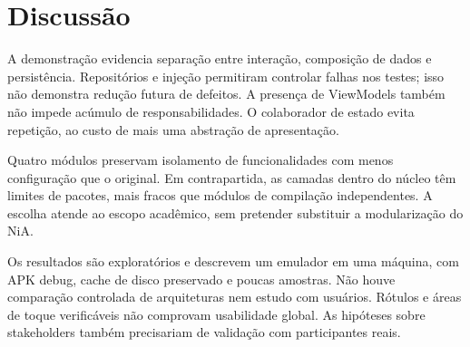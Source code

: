 \section{Discussão}\label{sec:discussao}
A demonstração evidencia separação entre interação, composição de dados e
persistência. Repositórios e injeção permitiram controlar falhas nos testes;
isso não demonstra redução futura de defeitos. A presença de ViewModels
também não impede acúmulo de responsabilidades. O colaborador de estado evita
repetição, ao custo de mais uma abstração de apresentação.

Quatro módulos preservam isolamento de funcionalidades com menos configuração
que o original. Em contrapartida, as camadas dentro do núcleo têm limites de
pacotes, mais fracos que módulos de compilação independentes. A escolha atende
ao escopo acadêmico, sem pretender substituir a modularização do NiA.

Os resultados são exploratórios e descrevem um emulador em uma máquina,
com APK debug, cache de disco preservado e poucas amostras. Não houve comparação controlada de
arquiteturas nem estudo com usuários. Rótulos e áreas de toque verificáveis
não comprovam usabilidade global. As hipóteses sobre stakeholders também
precisariam de validação com participantes reais.
